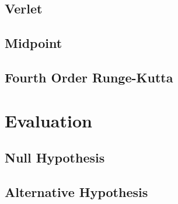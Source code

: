 \subsection{Verlet}

\subsection{Midpoint}

\subsection{Fourth Order Runge-Kutta}

\section{Evaluation}

\subsection{Null Hypothesis}

\subsection{Alternative Hypothesis}

